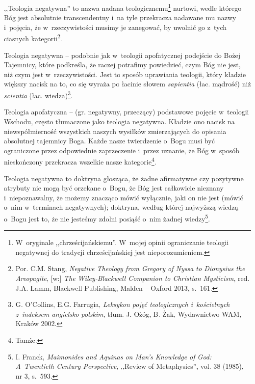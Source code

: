 \begin{defin}
,,Teologia negatywna'' to nazwa nadana teologicznemu\footnote{W~oryginale ,,chrześcijańskiemu''. W~mojej opinii ograniczanie teologii negatywnej do tradycji chrześcijańskiej jest nieporozumieniem.} nurtowi, wedle którego Bóg jest absolutnie transcendentny i~na tyle przekracza nadawane mu nazwy i~pojęcia, że w~rzeczywistości musimy je zanegować, by uwolnić go z~tych ciasnych kategorii\footnote{Por. C.M. Stang, \textit{Negative Theology from Gregory of Nyssa to Dionysius the Areopagite}, [w:] \textit{The Wiley-Blackwell Companion to Christian Mysticism}, red. J.A. Lamm, Blackwell Publishing, Malden -- Oxford 2013, s.~161.}.
\end{defin}
\begin{defin}
Teologia negatywna -- podobnie jak w~teologii apofatycznej podejście do Bożej Tajemnicy, które podkreśla, że raczej potrafimy powiedzieć, czym Bóg nie jest, niż czym jest w~rzeczywistości. Jest to sposób uprawiania teologii, który kładzie większy nacisk na to, co się wyraża po łacinie słowem \textit{sapientia} (łac. mądrość) niż \textit{scientia} (łac. wiedza)\footnote{G. O'Collins, E.G. Farrugia, \textit{Leksykon pojęć teologicznych i~kościelnych z~indeksem angielsko-polskim}, tłum. J. Ożóg, B. Żak, Wydawnictwo WAM, Kraków 2002.}.
\end{defin}
\begin{defin}
Teologia apofatyczna -- (gr. negatywny, przeczący) podstawowe pojęcie w~teologii Wschodu, często tłumaczone jako teologia negatywna. Kładzie ono nacisk na niewspółmierność wszystkich naszych wysiłków zmierzających do opisania absolutnej tajemnicy Boga. Każde nasze twierdzenie o~Bogu musi być ograniczone przez odpowiednie zaprzeczenie i~przez uznanie, że Bóg w~sposób nieskończony przekracza wszelkie nasze kategorie\footnote{Tamże.}.
\end{defin}
\begin{defin}\label{int-deftn-last}
Teologia negatywna to doktryna głosząca, że żadne afirmatywne czy pozytywne atrybuty nie mogą być orzekane o~Bogu, że Bóg jest całkowicie nieznany i~niepoznawalny, że możemy znacząco mówić wyłącznie, jaki on nie jest (mówić o~nim w~terminach negatywnych); doktryna, według której najwyższą wiedzą o~Bogu jest to, że nie jesteśmy zdolni posiąść o~nim żadnej wiedzy\footnote{I. Franck, \textit{Maimonides and Aquinas on Man's Knowledge of God: A~Twentieth Century Perspective}, ,,Review of Metaphysics'', vol. 38 (1985), nr 3, s.~593.}.
\end{defin}

